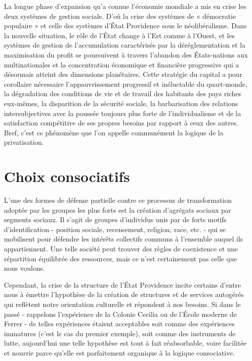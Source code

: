 La longue phase d'expansion qu'a connue l'économie mondiale a mis en crise les deux systèmes de gestion sociale. D'où la crise des systèmes de « démocratie populaire » et celle des systèmes d'État Providence sous le néolibéralisme. Dans la nouvelle situation, le rôle de l'État change à l'Est comme à l'Ouest, et les systèmes de gestion de l'accumulation caractérisés par la déréglementation et la maximisation du profit se poursuivent à travers l'abandon des États-nations aux multinationales et la concentration économique et financière progressive qui a désormais atteint des dimensions planétaires. Cette stratégie du capital a pour corollaire nécessaire l'appauvrissement progressif et inéluctable du quart-monde, la dégradation des conditions de vie et de travail des habitants des pays riches eux-mêmes, la disparition de la sécurité sociale, la barbarisation des relations intersubjectives avec la poussée toujours plus forte de l'individualisme et de la satisfaction compétitive de ses propres besoins par rapport à ceux des autres. Bref, c'est ce phénomène que l'on appelle communément la logique de la privatisation.

\section*{Choix consociatifs}

L'une des formes de défense partielle contre ce processus de transformation adoptée par les groupes les plus forts est la création d'agrégats sociaux par segments sociaux. Il s'agit de groupes d'individus unis par de forts motifs d'identification - position sociale, recensement, religion, race, etc. - qui se mobilisent pour défendre les intérêts collectifs communs à l'ensemble auquel ils appartiennent. Une telle société peut trouver des règles de coexistence et une répartition équilibrée des ressources, mais ce n'est certainement pas celle que nous voulons.

Cependant, la crise de la structure de l'État Providence incite certains d'entre nous à émettre l'hypothèse de la création de structures et de services autogérés qui reflètent notre orientation culturelle et répondent à nos besoins. Si dans le passé - rappelons l'expérience de la Colonie Cecilia ou de l'École moderne de Ferrer - de telles expériences étaient acceptables soit comme des expériences immatures (c'est le cas du premier exemple), soit comme des instruments de lutte, aujourd'hui une telle hypothèse est tout à fait réabsorbable, voire facilitée et nourrie parce qu'elle est parfaitement organique à la logique consociative.

